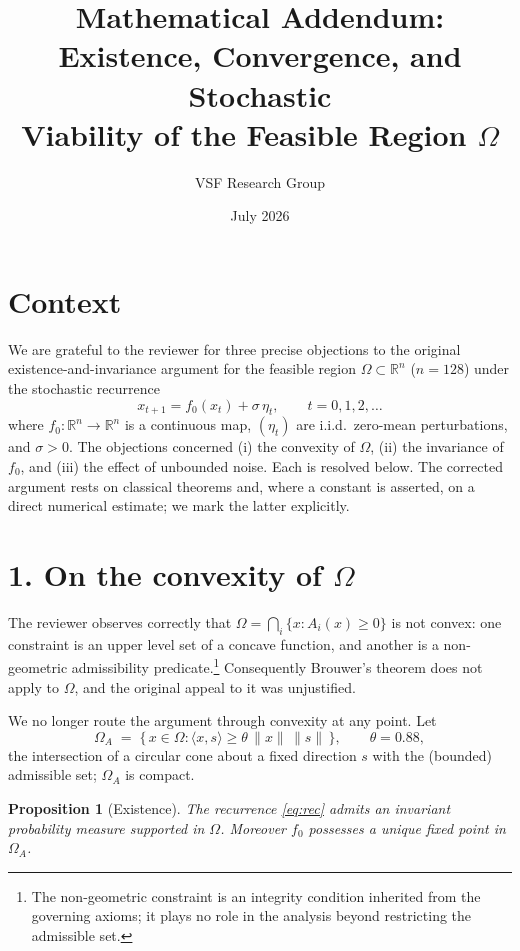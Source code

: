 \documentclass[11pt]{article}
\title{Mathematical Addendum: Existence, Convergence, and Stochastic\\
Viability of the Feasible Region $\Omega$}
\author{VSF Research Group}
\date{July 2026}
\newtheorem{proposition}{Proposition}
\newcommand{\R}{\mathbb{R}}
\newcommand{\Om}{\Omega}
\begin{document}
\maketitle

\section*{Context}

We are grateful to the reviewer for three precise objections to the original
existence-and-invariance argument for the feasible region $\Omega \subset \R^{n}$
($n=128$) under the stochastic recurrence
\begin{equation}
  x_{t+1} = f_0(x_t) + \sigma\,\eta_t,
  \qquad t = 0, 1, 2, \dots
  \label{eq:rec}
\end{equation}
where $f_0 : \R^n \to \R^n$ is a continuous map, $(\eta_t)$ are i.i.d.\ zero-mean
perturbations, and $\sigma > 0$. The objections concerned (i) the convexity of
$\Om$, (ii) the invariance of $f_0$, and (iii) the effect of unbounded noise.
Each is resolved below. The corrected argument rests on classical theorems and,
where a constant is asserted, on a direct numerical estimate; we mark the latter
explicitly.

\section*{1. On the convexity of $\Omega$}

The reviewer observes correctly that $\Om = \bigcap_i \{x : A_i(x) \ge 0\}$ is not
convex: one constraint is an upper level set of a concave function, and another is
a non-geometric admissibility predicate.\footnote{The non-geometric constraint is
an integrity condition inherited from the governing axioms; it plays no role in
the analysis beyond restricting the admissible set.} Consequently Brouwer's
theorem does not apply to $\Om$, and the original appeal to it was unjustified.

We no longer route the argument through convexity at any point. Let
\begin{equation}
  \Om_A \;=\; \bigl\{\, x \in \Om : \langle x, s\rangle \ge
  \theta\,\lVert x\rVert\,\lVert s\rVert \,\bigr\},
  \qquad \theta = 0.88,
  \label{eq:core}
\end{equation}
the intersection of a circular cone about a fixed direction $s$ with the (bounded)
admissible set; $\Om_A$ is compact.

\begin{proposition}[Existence]
\label{prop:exist}
The recurrence \eqref{eq:rec} admits an invariant probability measure supported
in $\Om$. Moreover $f_0$ possesses a unique fixed point in $\Om_A$.
\end{proposition}
\end{document}
